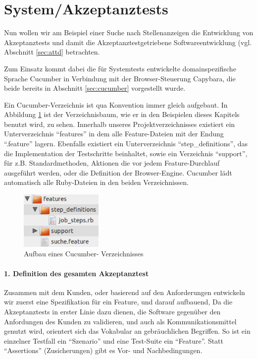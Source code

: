 \section{System/Akzeptanztests}
\label{sec:system}

Nun wollen wir am Beispiel einer Suche nach Stellenanzeigen die Entwicklung von Akzeptanztests und damit die Akzeptanztestgetriebene Softwareentwicklung (vgl. Abschnitt \ref{sec:attd} betrachten.

Zum Einsatz kommt dabei die für Systemtests entwickelte domainspezifische Sprache Cucumber in Verbindung mit der Browser-Steuerung Capybara, die beide bereits in Abschnitt \ref{sec:cucumber} vorgestellt wurde. 

Ein Cucumber-Verzeichnis ist qua Konvention immer gleich aufgebaut. In Abbildung \ref{fig:cucumberDir} ist der Verzeichnisbaum, wie er in den Beispielen dieses Kapitels benutzt wird, zu sehen. Innerhalb unseres Projektverzeichnisses existiert ein Unterverzeichnis "`features"' in dem alle Feature-Dateien mit der Endung "`.feature"' lagern. Ebenfalls existiert ein Unterverzeichnis "`step\_definitions"', das die Implementation der Testschritte beinhaltet, sowie ein Verzeichnis "`support"', für z.B. Standardmethoden, Aktionen die vor jedem Feature-Durchlauf ausgeführt werden, oder die Definition der Browser-Engine. Cucumber lädt automatisch alle Ruby-Dateien in den beiden Verzeichnissen.

\begin{figure}[hbtp]
 \centering
 \includegraphics[width=4cm]{./material/cucumber-aufbau.png}
 \caption{Aufbau eines Cucumber- Verzeichnisses}
 \label{fig:cucumberDir}
\end{figure}



\paragraph{1. Definition des gesamten Akzeptanztest}

Zusammen mit dem Kunden, oder basierend auf den Anforderungen entwickeln wir zuerst eine Spezifikation für ein Feature, und darauf aufbauend, Da die Akzeptanztests in erster Linie dazu dienen, die Software gegenüber den Anfordungen des Kunden zu validieren, und auch als Kommunikationsmittel genutzt wird, orientert sich das Vokabular an gebräuchlichen Begriffen. So ist ein einzelner Testfall ein "`Szenario"' und eine Test-Suite ein "`Feature"'. Statt "`Assertions"' (Zusicherungen) gibt es Vor- und Nachbedingungen.

